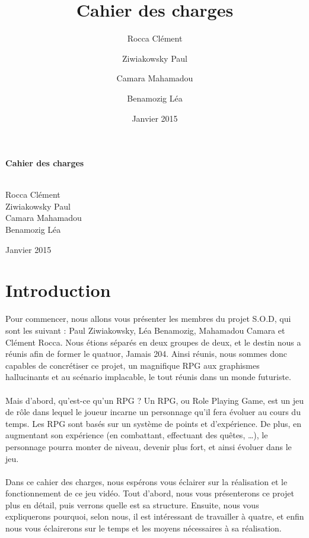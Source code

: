\documentclass[12pt]{article}
\title{Cahier des charges}
\author{Rocca Clément \and Ziwiakowsky Paul \and Camara Mahamadou \and Benamozig Léa}
\date{Janvier 2015}
\begin{document}
\makeatletter
\begin{titlepage}

\parindent0pt
\vspace{5cm}%
\hfill\begingroup\fontsize{75pt}{75pt}\selectfont\bfseries Cahier des charges\endgroup\hfill\null\par
\vspace{1cm}%
\\
\vspace{1cm}%
\large Rocca Clément\\  Ziwiakowsky Paul\\ Camara Mahamadou\\ Benamozig Léa\par
\normalfont\vfill
\hfill Janvier 2015\par\vspace{0.5cm}%

\end{titlepage}
\makeatother

\newpage
\tableofcontents

\newpage
\section*{Introduction}

Pour commencer, nous allons vous présenter les membres du projet S.O.D, qui sont les suivant : Paul Ziwiakowsky, Léa Benamozig, Mahamadou Camara et Clément Rocca. Nous étions séparés en deux groupes de deux, et le destin nous a réunis afin de former le quatuor, Jamais 204. Ainsi réunis, nous sommes donc capables de concrétiser ce projet, un magnifique RPG aux graphismes hallucinants et au scénario implacable, le tout réunis dans un monde futuriste.\\\\
Mais d’abord, qu’est-ce qu’un RPG ? Un RPG, ou Role Playing Game, est un jeu de rôle dans lequel le joueur incarne un personnage qu’il fera évoluer au cours du temps. Les RPG sont basés sur un système de points et d’expérience. De plus, en augmentant son expérience (en combattant, effectuant des quêtes, …), le personnage pourra monter de niveau, devenir plus fort, et ainsi évoluer dans le jeu.\\\\
Dans ce cahier des charges, nous espérons vous éclairer sur la réalisation et le fonctionnement de ce jeu vidéo. Tout d’abord, nous vous présenterons ce projet plus en détail, puis verrons quelle est sa structure. Ensuite, nous vous expliquerons pourquoi, selon nous, il est intéressant de travailler à quatre, et enfin nous vous éclairerons sur le temps et les moyens nécessaires à sa réalisation.
\end{document}
